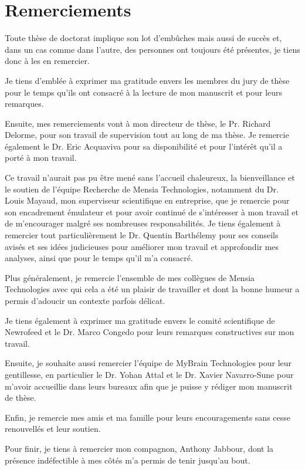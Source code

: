 \chapter*{Remerciements}

Toute thèse de doctorat implique son lot d'embûches mais aussi de succès et, dans un cas comme dans l'autre, des personnes ont toujours 
été présentes, je tiens donc à les en remercier. 

Je tiens d'emblée à exprimer ma gratitude envers les membres du jury de thèse pour le temps qu'ils ont consacré à la lecture de mon manuscrit et pour leurs 
remarques.

Ensuite, mes remerciements vont à mon directeur de thèse, le Pr. Richard Delorme, pour son travail de supervision tout au long
de ma thèse. Je remercie également le Dr. Eric Acquaviva pour sa disponibilité et pour l'intérêt qu'il a porté à mon travail. 

Ce travail n'aurait pas pu être mené sans l'accueil chaleureux, la bienveillance et le soutien de l'équipe Recherche de Mensia Technologies, notamment  
du Dr. Louis Mayaud, mon superviseur scientifique en entreprise, que je remercie pour son encadrement émulateur et 
pour avoir continué de s'intéresser à mon travail et de m'encourager malgré ses nombreuses
responsabilités. Je tiens également à remercier tout particulièrement le Dr. Quentin Barthélemy pour ses conseils 
avisés et ses idées judicieuses pour améliorer mon travail et approfondir mes analyses, ainsi que pour le temps qu'il m'a consacré. 

Plus généralement, je remercie l'ensemble de mes collègues de Mensia Technologies avec qui cela a été un plaisir de travailler et dont la bonne 
humeur a permis d'adoucir un contexte parfois délicat.

Je tiens également à exprimer ma gratitude envers le comité scientifique de Newrofeed et le Dr. Marco Congedo pour leurs remarques constructives sur mon travail. 

Ensuite, je souhaite aussi remercier l'équipe de MyBrain Technologies pour leur gentillesse, en particulier le Dr. Yohan Attal et le Dr. Xavier Navarro-Sune 
pour m'avoir accueillie dans leurs bureaux afin que je puisse y rédiger mon manuscrit de thèse. 

Enfin, je remercie mes amis et ma famille pour leurs encouragements sans cesse renouvellés et leur soutien.

Pour finir, je tiens à remercier mon compagnon, Anthony Jabbour, dont la présence indéfectible à mes côtés m'a permis de tenir jusqu'au bout.     